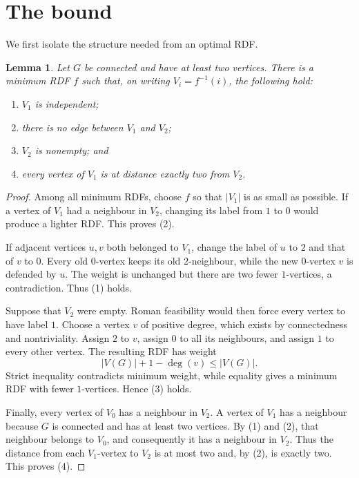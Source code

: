 \documentclass[11pt]{article}
\newtheorem{lemma}[theorem]{Lemma}
\begin{document}
\section{The bound}

We first isolate the structure needed from an optimal RDF.

\begin{lemma}\label{lem:rdf}
Let $G$ be connected and have at least two vertices.  There is a minimum RDF
$f$ such that, on writing $V_i=f^{-1}(i)$, the following hold:
\begin{enumerate}
  \item $V_1$ is independent;
  \item there is no edge between $V_1$ and $V_2$;
  \item $V_2$ is nonempty; and
  \item every vertex of $V_1$ is at distance exactly two from $V_2$.
\end{enumerate}
\end{lemma}

\begin{proof}
Among all minimum RDFs, choose $f$ so that $|V_1|$ is as small as possible.
If a vertex of $V_1$ had a neighbour in $V_2$, changing its label from $1$
to $0$ would produce a lighter RDF.  This proves (2).

If adjacent vertices $u,v$ both belonged to $V_1$, change the label of $u$
to $2$ and that of $v$ to $0$.  Every old $0$-vertex keeps its old
$2$-neighbour, while the new $0$-vertex $v$ is defended by $u$.  The weight
is unchanged but there are two fewer $1$-vertices, a contradiction.  Thus
(1) holds.

Suppose that $V_2$ were empty.  Roman feasibility would then force every
vertex to have label $1$.  Choose a vertex $v$ of positive degree, which
exists by connectedness and nontriviality.  Assign $2$ to $v$, assign $0$ to
all its neighbours, and assign $1$ to every other vertex.  The resulting RDF
has weight
\[
  |V(G)|+1-\deg(v)\leq |V(G)|.
\]
Strict inequality contradicts minimum weight, while equality gives a minimum
RDF with fewer $1$-vertices.  Hence (3) holds.

Finally, every vertex of $V_0$ has a neighbour in $V_2$.  A vertex of $V_1$
has a neighbour because $G$ is connected and has at least two vertices.  By
(1) and (2), that neighbour belongs to $V_0$, and consequently it has a
neighbour in $V_2$.  Thus the distance from each $V_1$-vertex to $V_2$ is at
most two and, by (2), is exactly two.  This proves (4).
\end{proof}
\end{document}
